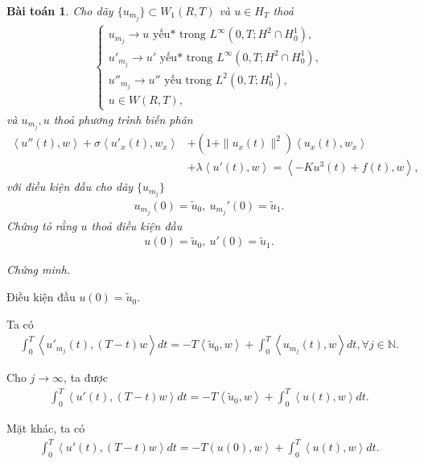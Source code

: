 \documentclass[12pt,a4paper]{article}
\def\N{\mathbb{N}}
\newtheorem{theorem}{Bài toán}[section]
\theoremstyle{definition}
\begin{document}
\begin{theorem}
    Cho dãy $\{u_{m_j}\} \subset W_1(R,T)$ và $u \in H_T$ thoả
    \begin{align*}
    \begin{cases}
        u_{m_j} \to u \text{ yếu* trong } L^\infty(0,T;H^2 \cap H^1_0), \\
        u'_{m_j} \to u' \text{ yếu* trong } L^\infty(0,T;H^2 \cap H^1_0), \\
        u''_{m_j} \to u'' \text{ yếu trong } L^2(0,T;H^1_0), \\
        u \in W(R,T),
    \end{cases}
    \end{align*}
    và $u_{m_j}, u$ thoả phương trình biến phân
    \begin{align*}
        \left<u''(t),w\right> + \sigma \left<u'_x(t),w_x\right> &+ \left(1 + \|u_x(t)\|^2\right) \left<u_x(t),w_x\right> \\
        &+ \lambda \left<u'(t),w\right> = \left<-Ku^3(t) + f(t),w\right>,
    \end{align*}
    với điều kiện đầu cho dãy $\{u_{m_j}\}$
    \begin{align*}
        u_{m_j}(0) = \tilde{u}_0, \ u_{m_j}'(0) = \tilde{u}_1.
    \end{align*}
    Chứng tỏ rằng $u$ thoả điều kiện đầu
    \begin{align*}
        u(0) = \tilde{u}_0, \ u'(0) = \tilde{u}_1.
    \end{align*}
\end{theorem}

\textit{Chứng minh.}

Điều kiện đầu $u(0) = \tilde{u}_0$.

Ta có
\begin{align*}
    \int_0^T \left<u'_{m_j}(t), (T-t)w\right> dt = -T\left<\tilde{u}_0,w\right> + \int_0^T \left<u_{m_j}(t),w\right>dt, \forall j \in \N.
\end{align*}

Cho $j \to \infty$, ta được
\begin{align*}
    \int_0^T \left<u'(t), (T-t)w\right>dt = -T\left<\tilde{u}_0,w\right> + \int_0^T \left<u(t),w\right>dt.
\end{align*}

Mặt khác, ta có
\begin{align*}
    \int_0^T \left<u'(t), (T-t)w\right>dt = -T\left(u(0),w\right> + \int_0^T \left<u(t),w\right>dt.
\end{align*}
\end{document}
